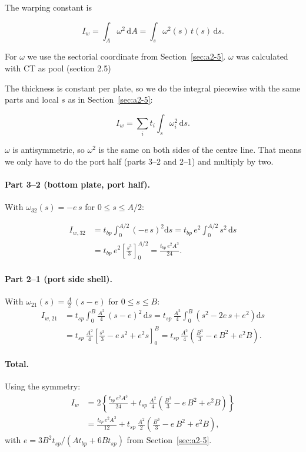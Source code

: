 The warping constant is

\begin{equation}
  I_w = \int_A \omega^2\,\mathrm{d}A = \int_s \omega^2(s)\,t(s)\,\mathrm{d}s .
  \label{eq:a26-Iw-def}
\end{equation}

For $\omega$ we use the sectorial coordinate from Section~\ref{sec:a2-5}. $\omega$ was calculated with CT as pool (section 2.5)

The thickness is constant per plate, so we do the integral piecewise with the same parts and local $s$ as in Section~\ref{sec:a2-5}:

\begin{equation}
  I_w = \sum_i t_i \int_{s} \omega_i^2\,\mathrm{d}s .
\end{equation}

$\omega$ is antisymmetric, so $\omega^2$ is the same on both sides of the centre line. That means we only have to do the port half (parts 3--2 and 2--1)
and multiply by two.

\paragraph{Part 3--2 (bottom plate, port half).}
With $\omega_{32}(s) = -e\,s$ for $0\le s\le A/2$:

\begin{align}
  I_{w,32} &= t_{bp}\int_0^{A/2} \left(-e\,s\right)^2\mathrm{d}s
            = t_{bp}\,e^2\int_0^{A/2} s^2\,\mathrm{d}s \nonumber\\
           &= t_{bp}\,e^2\left[\frac{s^3}{3}\right]_0^{A/2}
            = \frac{t_{bp}\,e^2A^3}{24} .
\end{align}

\paragraph{Part 2--1 (port side shell).}
With $\omega_{21}(s) = \frac{A}{2}\,(s-e)$ for $0\le s\le B$:
\begin{align}
  I_{w,21} &= t_{sp}\int_0^{B} \frac{A^2}{4}\,(s-e)^2\,\mathrm{d}s
            = t_{sp}\,\frac{A^2}{4}\int_0^{B} \left(s^2 - 2e\,s + e^2\right)\mathrm{d}s \nonumber\\
           &= t_{sp}\,\frac{A^2}{4}\left[\frac{s^3}{3} - e\,s^2 + e^2 s\right]_0^{B}
            = t_{sp}\,\frac{A^2}{4}\left(\frac{B^3}{3} - e\,B^2 + e^2B\right) .
\end{align}

\paragraph{Total.}
Using the symmetry:
\begin{align}
  I_w &= 2\left\{\frac{t_{bp}\,e^2A^3}{24} + t_{sp}\,\frac{A^2}{4}\left(\frac{B^3}{3} - e\,B^2 + e^2B\right)\right\} \nonumber\\
      &= \frac{t_{bp}\,e^2A^3}{12} + t_{sp}\,\frac{A^2}{2}\left(\frac{B^3}{3} - e\,B^2 + e^2B\right),
  \label{eq:a26-Iw-e}
\end{align}
with $e = 3B^2 t_{sp}/(A t_{bp} + 6B t_{sp})$ from Section~\ref{sec:a2-5}.

